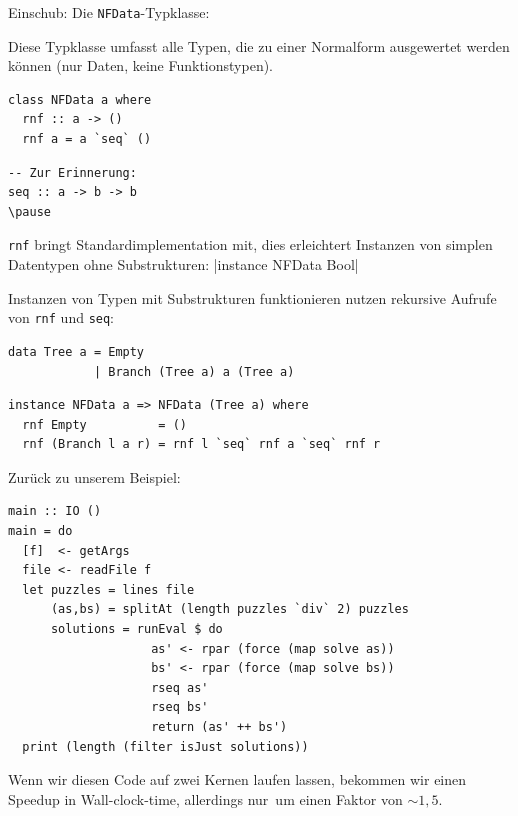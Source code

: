 \documentclass{beamer}
\begin{document}
\begin{frame}[fragile]
Einschub: Die \texttt{NFData}-Typklasse:\smallskip

Diese Typklasse umfasst alle Typen, die zu einer Normalform ausgewertet werden können (nur Daten, keine Funktionstypen).
\pause

\begin{multicols}{2}
\begin{verbatim}
class NFData a where
  rnf :: a -> ()
  rnf a = a `seq` ()
\end{verbatim}
\columnbreak
\pause

\begin{verbatim}
-- Zur Erinnerung:
seq :: a -> b -> b
\pause
\end{verbatim}
\end{multicols}

\texttt{rnf} bringt Standardimplementation mit, dies erleichtert Instanzen von simplen Datentypen ohne Substrukturen:
|instance NFData Bool|
\pause

Instanzen von Typen mit Substrukturen funktionieren nutzen rekursive Aufrufe von \texttt{rnf} und \texttt{seq}:

\begin{verbatim}
data Tree a = Empty
            | Branch (Tree a) a (Tree a)
\end{verbatim}

\begin{verbatim}
instance NFData a => NFData (Tree a) where
  rnf Empty          = ()
  rnf (Branch l a r) = rnf l `seq` rnf a `seq` rnf r
\end{verbatim}

\end{frame}


\begin{frame}[fragile]
Zurück zu unserem Beispiel:

\begin{verbatim}
main :: IO ()
main = do
  [f]  <- getArgs
  file <- readFile f
  let puzzles = lines file
      (as,bs) = splitAt (length puzzles `div` 2) puzzles
      solutions = runEval $ do
                    as' <- rpar (force (map solve as))
                    bs' <- rpar (force (map solve bs))
                    rseq as'
                    rseq bs'
                    return (as' ++ bs')
  print (length (filter isJust solutions))
\end{verbatim}
\pause

Wenn wir diesen Code auf zwei Kernen laufen lassen, bekommen wir einen Speedup in Wall-clock-time, allerdings \glqq nur\grqq\ um einen Faktor von $\sim 1,5$.
\end{frame}
\end{document}
